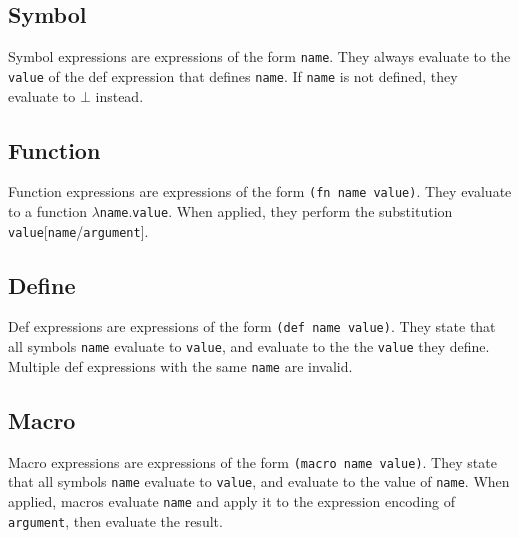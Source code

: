 \documentclass{article}
\begin{document}
    \begin{multicols}{2}
        \subsection{Symbol}\label{subsec:symbol}

        \begin{minipage}{\columnwidth}
            Symbol expressions are expressions of the form \texttt{name}.
            They always evaluate to the \texttt{value} of the def expression that defines \texttt{name}.
            If \texttt{name} is not defined, they evaluate to $\bot$ instead.
        \end{minipage}

        \subsection{Function}\label{subsec:function}

        \begin{minipage}{\columnwidth}
            Function expressions are expressions of the form \lstinline{(fn name value)}.
            They evaluate to a function $\lambda$\texttt{name}.\texttt{value}.
            When applied, they perform the substitution \texttt{value}[\texttt{name}/\texttt{argument}].
        \end{minipage}

        \subsection{Define}\label{subsec:def}

        \begin{minipage}{\columnwidth}
            Def expressions are expressions of the form \lstinline{(def name value)}.
            They state that all symbols \texttt{name} evaluate to \texttt{value}, and evaluate to the the \texttt{value} they define.
            Multiple def expressions with the same \texttt{name} are invalid.
        \end{minipage}

        \subsection{Macro}\label{subsec:macro}

        \begin{minipage}{\columnwidth}
            Macro expressions are expressions of the form \lstinline{(macro name value)}.
            They state that all symbols \texttt{name} evaluate to \texttt{value}, and evaluate to the value of \texttt{name}.
            When applied, macros evaluate \texttt{name} and apply it to the expression encoding of \texttt{argument}, then evaluate the result.
        \end{minipage}


\end{multicols}
\end{document}
